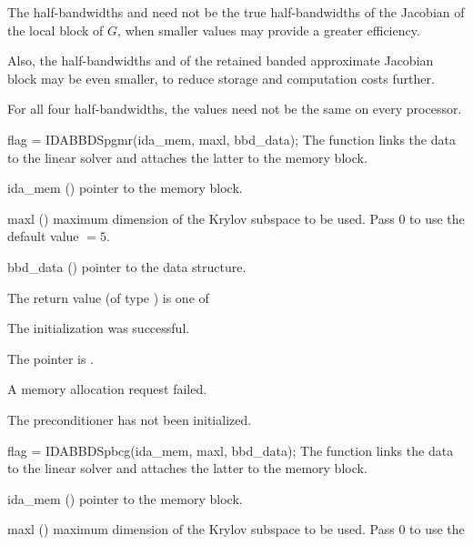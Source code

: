 {{  The half-bandwidths  and  need not be the true 
  half-bandwidths of the Jacobian of the local block of $G$,    
  when smaller values may provide a greater efficiency.       

  Also, the half-bandwidths  and  of the retained 
  banded approximate Jacobian block may be even smaller,      
  to reduce storage and computation costs further.            

  For all four half-bandwidths, the values need not be the    
  same on every processor.
}
{
  flag = IDABBDSpgmr(ida\_mem, maxl, bbd\_data);
}
{
  The function  links the {\idabbdpre} data to the
  {\idaspgmr} linear solver and attaches the latter to the {\ida}
  memory block.
}
{
  \begin{args}
  \item[ida\_mem] ()
    pointer to the {\ida} memory block.
  \item[maxl] ()
    maximum dimension of the Krylov subspace to be used. Pass $0$ to use the 
    default value $=5$.
  \item[bbd\_data] ()
    pointer to the {\idabbdpre} data structure.
  \end{args}
}
{
  The return value  (of type ) is one of
  \begin{args}
  \item[\Id{IDASPGMR\_SUCCESS}] 
    The {\idaspgmr} initialization was successful.
  \item[\Id{IDASPGMR\_MEM\_NULL}]
    The  pointer is .
  \item[\Id{IDASPGMR\_MEM\_FAIL}]
    A memory allocation request failed.
  \item[\Id{IDA\_PDATA\_NULL}]
    The {\idabbdpre} preconditioner has not been initialized.
  \end{args}
}
{}
{
  flag = IDABBDSpbcg(ida\_mem, maxl, bbd\_data);
}
{
  The function  links the {\idabbdpre} data to the
  {\idaspbcg} linear solver and attaches the latter to the {\ida}
  memory block.
}
{
  \begin{args}
  \item[ida\_mem] ()
    pointer to the {\ida} memory block.
  \item[maxl] ()
    maximum dimension of the Krylov subspace to be used. Pass $0$ to use the 

\end{args}}}
